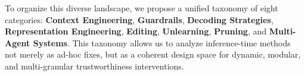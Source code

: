 To organize this diverse landscape, we propose a unified taxonomy of eight categories: \textbf{Context Engineering}, \textbf{Guardrails}, \textbf{Decoding Strategies}, \textbf{Representation Engineering}, \textbf{Editing}, \textbf{Unlearning}, \textbf{Pruning}, and \textbf{Multi-Agent Systems}. This taxonomy allows us to analyze inference-time methods not merely as ad-hoc fixes, but as a coherent design space for dynamic, modular, and multi-granular trustworthiness interventions.


